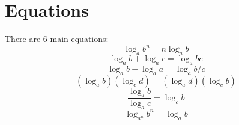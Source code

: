 \section{Equations}

There are 6 main equations:
\begin{equation}
    \log_a{b^n} = n\log_a{b}
\end{equation}
\begin{equation}
    \log_a{b} + \log_a{c} = \log_a{bc}
\end{equation}
\begin{equation}
    \log_a{b} - \log_a{a} = \log_a{b/c}
\end{equation}
\begin{equation}
    (\log_a{b})(\log_c{d}) = (\log_a{d})(\log_c{b})
\end{equation}
\begin{equation}
    \frac{\log_a{b}}{\log_a{c}} = \log_c{b}
\end{equation}
\begin{equation}
    \log_{a^n}{b^n} = \log_a{b}
\end{equation}